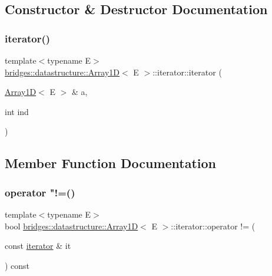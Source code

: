 \subsection{Constructor \& Destructor Documentation}
\mbox{\label{classbridges_1_1datastructure_1_1_array1_d_1_1iterator_a5bfe7e8948825c5814a95b05551496e4}} 
\subsubsection{\texorpdfstring{iterator()}{iterator()}}
{\footnotesize\ttfamily template$<$typename E$>$ \\
\mbox{\hyperlink{classbridges_1_1datastructure_1_1_array1_d}{bridges\+::datastructure\+::\+Array1D}}$<$ E $>$\+::iterator\+::iterator (\begin{DoxyParamCaption}\item[{\mbox{\hyperlink{classbridges_1_1datastructure_1_1_array1_d}{Array1D}}$<$ E $>$ \&}]{a,  }\item[{int}]{ind }\end{DoxyParamCaption})\hspace{0.3cm}{\ttfamily [inline]}}



\subsection{Member Function Documentation}
\mbox{\label{classbridges_1_1datastructure_1_1_array1_d_1_1iterator_a62c96bb924e252c3cf06cd1a5de923dc}} 
\subsubsection{\texorpdfstring{operator "!=()}{operator !=()}}
{\footnotesize\ttfamily template$<$typename E$>$ \\
bool \mbox{\hyperlink{classbridges_1_1datastructure_1_1_array1_d}{bridges\+::datastructure\+::\+Array1D}}$<$ E $>$\+::iterator\+::operator != (\begin{DoxyParamCaption}\item[{const \mbox{\hyperlink{classbridges_1_1datastructure_1_1_array1_d_1_1iterator}{iterator}} \&}]{it }\end{DoxyParamCaption}) const\hspace{0.3cm}{\ttfamily [inline]}}


